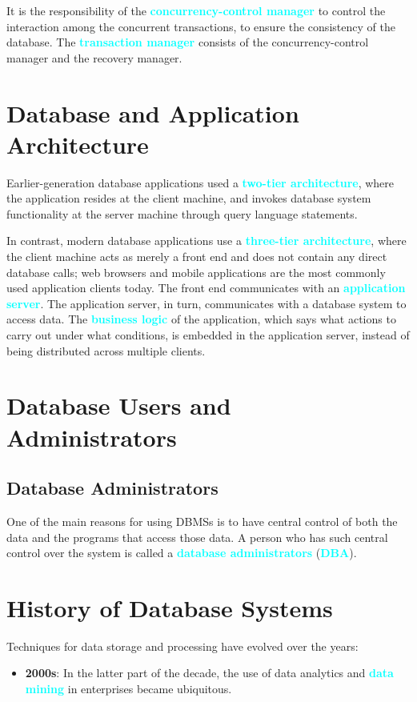 \documentclass{Beautybook-EN}
\newcommand{\textcy}[1]{\textbf{\textcolor{cyan}{#1}}}
\begin{document}
It is the responsibility of the \textcy{concurrency-control manager} to control the interaction among the concurrent transactions, to ensure the consistency of the database. The \textcy{transaction manager} consists of the concurrency-control manager and the recovery manager.

\section{Database and Application Architecture}

Earlier-generation database applications used a \textcy{two-tier architecture}, where the application resides at the client machine, and invokes database system functionality at the server machine through query language statements.

In contrast, modern database applications use a \textcy{three-tier architecture}, where the client machine acts as merely a front end and does not contain any direct database calls; web browsers and mobile applications are the most commonly used application clients today. The front end communicates with an \textcy{application server}. The application server, in turn, communicates with a database system to access data. The \textcy{business logic} of the application, which says what actions to carry out under what conditions, is embedded in the application server, instead of being distributed across multiple clients.

\section{Database Users and Administrators}
\subsection{Database Administrators}

One of the main reasons for using DBMSs is to have central control of both the data and the programs that access those data. A person who has such central control over the system is called a \textcy{database administrators} (\textcy{DBA}).

\section{History of Database Systems}

Techniques for data storage and processing have evolved over the years:
\begin{itemize}
    \item\textbf{2000s}: In the latter part of the decade, the use of data analytics and \textcy{data mining} in enterprises became ubiquitous.
\end{itemize}
\end{document}
